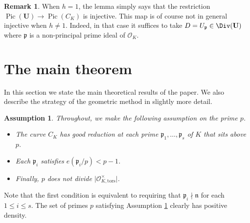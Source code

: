 \documentclass[11pt,oneside]{amsart}
\theoremstyle{plain}
\newtheorem{assumption}[theorem]{Assumption}
\theoremstyle{definition}
\newtheorem{remark}[theorem]{Remark}
\DeclareMathOperator{\tors}{tors}
\DeclareMathOperator{\Pic}{Pic}
\def\Q{\mathbb{Q}}
\def\U{\mathbf{U}}
\def\oh{\mathcal{O}}
\begin{document}
\begin{remark}
When $h = 1$, the lemma simply says that the restriction $\Pic (\U) \rightarrow \Pic (C_K) $ is injective. This map is of course not in general injective when $h\neq 1$.  Indeed, in that case it suffices to take $D=U_{\mathfrak{p}}\in \Div(\U)$ where $\mathfrak{p}$ is a non-principal prime ideal of $\oh_K$.  
\end{remark}





\section{The main theorem}\label{s:method}

In this section we state the main theoretical results of the paper. We  also describe the strategy of the geometric method in slightly more detail. 

\begin{assumption}\label{passumption} 
 Throughout, we make the following assumption on the prime $p$. 
\begin{itemize}
\item The curve $C_K$ has good reduction at each prime $\mathfrak{p}_1, \ldots, \mathfrak{p}_s$ of $K$ that sits above $p$. 
\item Each $\mathfrak{p}_i$ satisfies $e(\mathfrak{p}_i/p) < p-1$. 
\item Finally, $p$ does not divide $\vert \oh_{K, \mathrm{tors}}^\times \vert$.
\end{itemize}
\end{assumption}
\noindent Note that the first condition is equivalent to requiring that $\mathfrak{p}_i \nmid \mathfrak{n}$ for each $1\leq i\leq s$. %
The set of primes $p$ satisfying Assumption \ref{passumption} clearly has positive density. 

\end{document}
